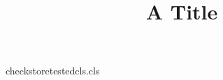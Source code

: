 \begin{filecontents*}[force]{checkstoretestedcls.cls}
\def\tested#1{\gdef\@tested{#1}}\def\@tested{}
\def\noted#1{\gdef\@noted{#1}}\def\@noted{}
\renewcommand\maketitle{\par{\@title\par}\edef\@tempa{\@tested}\ifx\@tempa\@empty\fi{\@noted\par}}
\end{filecontents*}
\documentclass{checkstoretestedcls}
\title{A Title}
\maketitle
Text.

